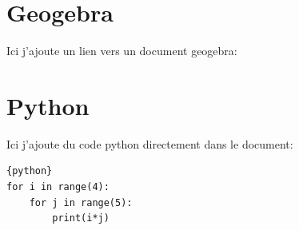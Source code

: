 \documentclass[a4paper,11pt]{article}
\begin{document}
\section{Geogebra}
Ici j'ajoute un lien vers un document geogebra:\par
{} %

\section{Python}
Ici j'ajoute du code python directement dans le document:\par
\begin{verbatim}{python}
for i in range(4):
    for j in range(5):
        print(i*j)
\end{verbatim}
\end{document}
